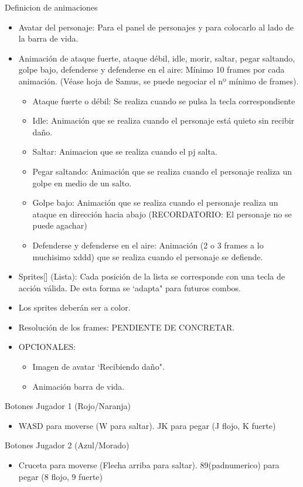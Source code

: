 \documentclass[10pt,a4paper,titlepage]{article}
\begin{document}
Definicion de animaciones 
\begin{itemize}
	\item Avatar del personaje: Para el panel de personajes y para colocarlo al lado de la barra de vida.
	\item Animación de ataque fuerte, ataque débil, idle, morir, saltar, pegar saltando, golpe bajo, defenderse y defenderse en el aire: Mínimo 10 frames por cada animación. (Véase hoja de Samus, se puede negociar el nº mínimo de frames).
	\begin{itemize}
		\item Ataque fuerte o débil: Se realiza cuando se pulsa la tecla correspondiente
		\item Idle: Animación que se realiza cuando el personaje está quieto sin recibir daño.
		\item Saltar: Animacion que se realiza cuando el pj salta.
		\item Pegar saltando: Animación que se realiza cuando el personaje realiza un golpe en medio de un salto.
		\item Golpe bajo: Animación que se realiza cuando el personaje realiza un ataque en dirección hacia abajo (RECORDATORIO: El personaje no se puede agachar)
		\item Defenderse y defenderse en el aire: Animación (2 o 3 frames a lo muchisimo xddd) que se realiza cuando el personaje se defiende.
	\end{itemize}
	\item Sprites[] (Lista): Cada posición de la lista se corresponde con una tecla de acción válida. De esta forma se `adapta" para futuros combos.
	\item Los sprites deberán ser a color.
	\item Resolución de los frames: PENDIENTE DE CONCRETAR.
	\item OPCIONALES: 
	\begin{itemize}
		\item Imagen de avatar `Recibiendo daño".
		\item Animación barra de vida.
	\end{itemize}
\end{itemize}


Botones Jugador 1 (Rojo/Naranja)
\begin{itemize}
	\item WASD para moverse (W para saltar). JK para pegar (J flojo, K fuerte)
\end{itemize}
Botones Jugador 2 (Azul/Morado)
\begin{itemize}
	\item Cruceta para moverse (Flecha arriba para saltar). 89(padnumerico) para pegar (8 flojo, 9 fuerte)
\end{itemize}
\end{document}
